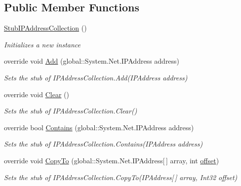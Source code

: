 \subsection*{Public Member Functions}
\begin{DoxyCompactItemize}
\item 
\hyperlink{class_system_1_1_net_1_1_network_information_1_1_fakes_1_1_stub_i_p_address_collection_a00f5f1fc0e7cd1e246ccb185d93ad2b2}{Stub\-I\-P\-Address\-Collection} ()
\begin{DoxyCompactList}\small\item\em Initializes a new instance\end{DoxyCompactList}\item 
override void \hyperlink{class_system_1_1_net_1_1_network_information_1_1_fakes_1_1_stub_i_p_address_collection_a82e8e95786df5c04ce0da4ade1b08dc4}{Add} (global\-::\-System.\-Net.\-I\-P\-Address address)
\begin{DoxyCompactList}\small\item\em Sets the stub of I\-P\-Address\-Collection.\-Add(\-I\-P\-Address address)\end{DoxyCompactList}\item 
override void \hyperlink{class_system_1_1_net_1_1_network_information_1_1_fakes_1_1_stub_i_p_address_collection_a5f88155e45025a55f72ad626abe2e36c}{Clear} ()
\begin{DoxyCompactList}\small\item\em Sets the stub of I\-P\-Address\-Collection.\-Clear()\end{DoxyCompactList}\item 
override bool \hyperlink{class_system_1_1_net_1_1_network_information_1_1_fakes_1_1_stub_i_p_address_collection_a924eda2d7a0abf7cd2918b7384a58988}{Contains} (global\-::\-System.\-Net.\-I\-P\-Address address)
\begin{DoxyCompactList}\small\item\em Sets the stub of I\-P\-Address\-Collection.\-Contains(\-I\-P\-Address address)\end{DoxyCompactList}\item 
override void \hyperlink{class_system_1_1_net_1_1_network_information_1_1_fakes_1_1_stub_i_p_address_collection_a915d83c937c0ac0ebe3e5737aa9b8c8b}{Copy\-To} (global\-::\-System.\-Net.\-I\-P\-Address\mbox{[}$\,$\mbox{]} array, int \hyperlink{jquery-1_810_82_8js_a4a9f594d20d927164551fc7fa4751a2f}{offset})
\begin{DoxyCompactList}\small\item\em Sets the stub of I\-P\-Address\-Collection.\-Copy\-To(\-I\-P\-Address\mbox{[}$\,$\mbox{]} array, Int32 offset)\end{DoxyCompactList}\item 

\end{DoxyCompactItemize}
